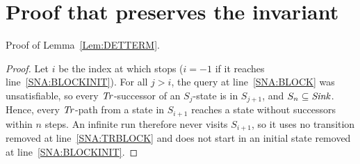 \section{Proof that \blockTerm preserves the invariant}\label{App:BlockTerm}

Proof of Lemma~\ref{Lem:DETTERM}.
\begin{proof}
    Let $i$ be the index at which \blockTerm stops ($i=-1$ if it reaches line~\ref{SNA:BLOCKINIT}).
    For all $j > i$, the query at line~\ref{SNA:BLOCK} was unsatisfiable, so every $\mathit{Tr}$-successor of an $S_j$-state
    is in $S_{j+1}$, and $S_n \subseteq \mathit{Sink}$. Hence, every $\mathit{Tr}$-path from a state in $S_{i+1}$
    reaches a state without successors within $n$ steps.
    An infinite run therefore never visits $S_{i+1}$, so it uses no transition removed at line~\ref{SNA:TRBLOCK}
    and does not start in an initial state removed at line~\ref{SNA:BLOCKINIT}.
\end{proof}
